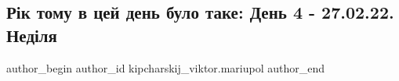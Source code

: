  
 
 
 
 

\subsection{Рік тому в цей день було таке:  День 4 - 27.02.22.  Неділя}
\label{sec:27_02_2023.fb.kipcharskij_viktor.mariupol.1.r_k_tomu_v_tsei_den_}

\ifcmt
 author_begin
   author_id kipcharskij_viktor.mariupol
 author_end
\fi
